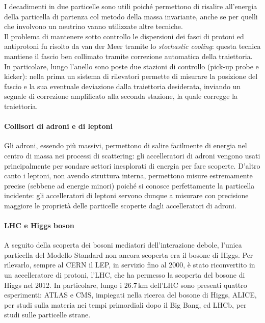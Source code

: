 I decadimenti in due particelle sono utili poiché permettono di risalire all'energia della particella di partenza col metodo della massa invariante, anche se per quelli che involvono un neutrino vanno utilizzate altre tecniche.\\
Il problema di mantenere sotto controllo le dispersioni dei fasci di protoni ed antiprotoni fu risolto da van der Meer tramite lo \textit{stochastic cooling}: questa tecnica mantiene il fascio ben collimato tramite correzione automatica della traiettoria. In particolare, lungo l'anello sono poste due stazioni di controllo (pick-up probe e kicker): nella prima un sistema di rilevatori permette di misurare la posizione del fascio e la sua eventuale deviazione dalla traiettoria desiderata, inviando un segnale di correzione amplificato alla seconda stazione, la quale corregge la traiettoria.

\paragraph{Collisori di adroni e di leptoni}

Gli adroni, essendo più massivi, permettono di salire facilmente di energia nel centro di massa nei processi di scattering: gli accelleratori di adroni vengono usati principalmente per sondare settori inesplorati di energia per fare scoperte. D'altro canto i leptoni, non avendo struttura interna, permettono misure estremamente precise (sebbene ad energie minori) poiché si conosce perfettamente la particella incidente: gli accelleratori di leptoni servono dunque a misurare con precisione maggiore le proprietà delle particelle scoperte dagli accelleratori di adroni.

\paragraph{LHC e Higgs boson}

A seguito della scoperta dei bosoni mediatori dell'interazione debole, l'unica particella del Modello Standard non ancora scoperta era il bosone di Higgs. Per rilevarlo, sempre al CERN il LEP, in servizio fino al 2000, è stato riconvertito in un accelleratore di protoni, l'LHC, che ha permesso la scoperta del bosone di Higgs nel 2012. In particolare, lungo i $ 26.7\,\text{km} $ dell'LHC sono presenti quattro esperimenti: ATLAS e CMS, impiegati nella ricerca del bosone di Higgs, ALICE, per studi sulla materia nei tempi primordiali dopo il Big Bang, ed LHCb, per studi sulle particelle strane.










